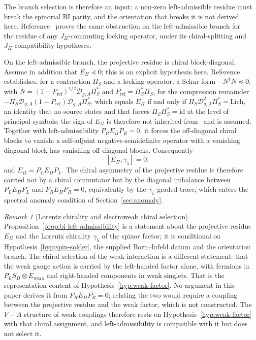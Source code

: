 \documentclass[11pt,a4paper]{article}
\theoremstyle{definition}
\theoremstyle{remark}
\newtheorem{remark}[theorem]{Remark}
\begin{document}
    The branch selection is therefore an input: a non-zero left-admissible residue must break the
    spinorial BI parity, and the orientation that breaks it is not derived here.
    Reference~\cite{Beau2026prs} proves the same obstruction on the left-admissible branch for the residue of any
    $J_\Pi$-commuting locking operator, under its chiral-splitting and $J_\Pi$-compatibility hypotheses.

    On the left-admissible branch, the projective residue is chiral block-diagonal.
    Assume in addition that $E_\Pi \preceq 0$; this is an explicit hypothesis here.
    Reference~\cite{Beau2026prs} establishes, for a contraction $\Pi_S$ and a locking operator, a Schur form $-N^\dagger N \preceq 0$, with $N = (1-P_{\mathrm{ref}})^{1/2}\mathcal{D}_{g,A}\Pi_S^*$ and
    $P_{\mathrm{ref}} = \Pi_S^*\Pi_S$, for the compression remainder
    $-\Pi_S \mathcal{D}_{g,A}(1-P_{\mathrm{ref}})\mathcal{D}_{g,A}\Pi_S^*$, which equals $E_\Pi$ if and only if
    $\Pi_S \mathcal{D}_{g,A}^2 \Pi_S^* = \mathrm{Lich}$, an identity that no source states and that forces
    $\Pi_S\Pi_S^* = \mathrm{id}$ at the level of principal symbols; the sign of $E_\Pi$ is therefore not
    inherited from~\cite{Beau2026prs} and is assumed.
    Together with left-admissibility $P_R E_\Pi P_R = 0$, it forces the off-diagonal
    chiral blocks to vanish: a self-adjoint negative-semidefinite operator with a
    vanishing diagonal block has vanishing off-diagonal blocks.
    Consequently
    \begin{equation}
      \label{eq:epi-gamma5-commutator}
      [E_\Pi, \gamma_5] = 0 ,
    \end{equation}
    and $E_\Pi = P_L E_\Pi P_L$.
    The chiral asymmetry of the projective residue is therefore carried not by a chiral
    commutator but by the diagonal imbalance between $P_L E_\Pi P_L$ and
    $P_R E_\Pi P_R = 0$, equivalently by the $\gamma_5$-graded trace, which enters the spectral
    anomaly condition of Section~\ref{sec:anomaly}.

    \begin{remark}[Lorentz chirality and electroweak chiral selection]
      \label{rem:lorentz-vs-weak-chirality}
      Proposition~\ref{prop:bi-left-admissibility} is a statement about the projective residue $E_\Pi$
      and the Lorentz chirality $\gamma_5$ of the spinor factor; it is conditional on
      Hypothesis~\ref{hyp:spin-solder}, the supplied Born--Infeld datum and the orientation branch.
      The chiral selection of the weak interaction is a different statement: that the weak gauge action
      is carried by the left-handed factor alone, with fermions in
      $P_L S_\Pi \otimes E_{\mathrm{weak}}$ and right-handed components in weak singlets.
      That is the representation content of Hypothesis~\ref{hyp:weak-factor}.
      No argument in this paper derives it from $P_R E_\Pi P_R = 0$; relating the two would require a
      coupling between the projective residue and the weak factor, which is not constructed.
      The $V{-}A$ structure of weak couplings therefore rests on Hypothesis~\ref{hyp:weak-factor} with
      that chiral assignment, and left-admissibility is compatible with it but does not select it.
    \end{remark}
\end{document}
